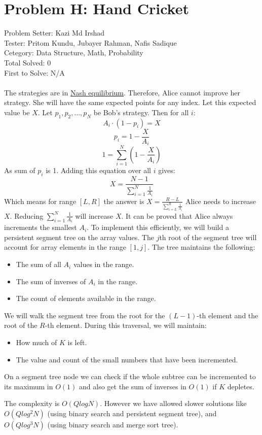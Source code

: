 \section*{Problem H: Hand Cricket}
Problem Setter: Kazi Md Irshad \\
Tester: Pritom Kundu, Jubayer Rahman, Nafis Sadique \\
Cetegory: Data Structure, Math, Probability \\
Total Solved: 0 \\
First to Solve: N/A \\
\\
The strategies are in \href{https://en.wikipedia.org/wiki/Nash_equilibrium}{Nash equilibrium}. Therefore, Alice cannot improve her strategy. She will have the same expected points for any index. Let this expected value be $X$. Let $p_1, p_2, \dots, p_N$ be Bob's strategy. Then for all $i$:
$$ A_i \cdot (1 - p_i) = X $$
$$p_i = 1 - \frac{X}{A_i}$$
$$1 = \sum_{i=1}^N(1-\frac{X}{A_i})$$
As sum of $p_i$ is 1. Adding this equation over all $i$ gives:
$$ X = \frac{N - 1}{\sum_{i=1}^N \frac{1}{A_i}}$$ 
Which means for range $[L,R]$ the answer is $X = \frac{R-L}{\sum_{i=L}^R \frac{1}{A_i}}$
Alice needs to increase $X$. Reducing $\sum_{i=1}^N \frac{1}{A_i}$ will increase $X$. It can be proved that Alice always increments the smallest $A_i$. To implement this efficiently, we will build a persistent segment tree on the array values. The $j$th root of the segment tree will account for array elements in the range $[1, j]$. The tree maintains the following:
\begin{itemize}
    \item The sum of all $A_i$ values in the range.
    \item The sum of inverses of $A_i$ in the range.
    \item The count of elements available in the range.
\end{itemize}
We will walk the segment tree from the root for the $(L-1)$-th element and the root of the $R$-th element. During this traversal, we will maintain:
\begin{itemize}
    \item How much of $K$ is left.
    \item The value and count of the small numbers that have been incremented.
\end{itemize}
On a segment tree node we can check if the whole subtree can be incremented to its maximum in $O(1)$ and also get the sum of inverses in $O(1)$ if $K$ depletes.

The complexity is $O(QlogN)$. However we have allowed slower solutions like $O(Qlog^2N)$ (using binary search and persistent segment tree), and $O(Qlog^3N)$ (using binary search and merge sort tree).
